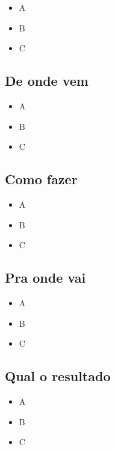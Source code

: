 \documentclass[
]{article}
\providecommand{\tightlist}{%
  \setlength{\itemsep}{0pt}\setlength{\parskip}{0pt}}
\begin{document}
\begin{itemize}
\tightlist
\item
  A
\item
  B
\item
  C
\end{itemize}

\hypertarget{de-onde-vem-6}{%
\subsection*{De onde vem}\label{de-onde-vem-6}}

\begin{itemize}
\tightlist
\item
  A
\item
  B
\item
  C
\end{itemize}

\hypertarget{como-fazer-6}{%
\subsection*{Como fazer}\label{como-fazer-6}}

\begin{itemize}
\tightlist
\item
  A
\item
  B
\item
  C
\end{itemize}

\hypertarget{pra-onde-vai-6}{%
\subsection*{Pra onde vai}\label{pra-onde-vai-6}}

\begin{itemize}
\tightlist
\item
  A
\item
  B
\item
  C
\end{itemize}

\hypertarget{qual-o-resultado-6}{%
\subsection*{Qual o resultado}\label{qual-o-resultado-6}}

\begin{itemize}
\tightlist
\item
  A
\item
  B
\item
  C
\end{itemize}
\end{document}
